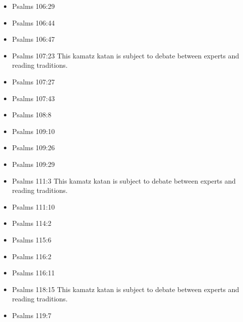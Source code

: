 \documentclass[14pt]{article}
\begin{document}
\begin{multicols}{2}
\begin{itemize}
					\item Psalms 106:29
					
					\item Psalms 106:44
					
					\item Psalms 106:47
					
					\item Psalms 107:23 This kamatz katan is subject to debate between experts and reading traditions.
					
					\item Psalms 107:27
					
					\item Psalms 107:43
							
							\item Psalms 108:8
							
							\item Psalms 109:10
							
							\item Psalms 109:26
							
							\item Psalms 109:29
							
							\item Psalms 111:3 This kamatz katan is subject to debate between experts and reading traditions.
							
							\item Psalms 111:10
							
							\item Psalms 114:2
							
							\item Psalms 115:6
							
							\item Psalms 116:2
							
							\item Psalms 116:11
						
							
							\item Psalms 118:15 This kamatz katan is subject to debate between experts and reading traditions.
							
							\item Psalms 119:7
							

\end{itemize}
\end{multicols}
\end{document}
